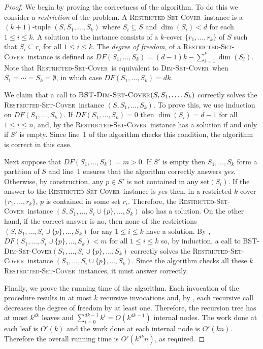 \documentclass[ccfonts,lotsofwhite]{patmorin}
\newcommand{\set}{\mathrm{set}}
\newcommand{\setcover}{\textsc{Dim-Set-Cover}}
\newcommand{\rsetcover}{\textsc{Restricted-Set-Cover}}
\newcommand{\DF}{DF}
\begin{document}
\begin{proof}
We begin by proving the correctness of the algorithm.  To do this we
consider a \emph{restriction} of the problem.  A \rsetcover\ instance
is a $(k+1)$-tuple $(S,S_1,\ldots,S_k)$ where $S_i\subseteq S$ and
$\dim(S_i)<d$ for each $1\le i\le k$.  A solution to the instance
consists of a $k$-cover $\{r_1,\ldots,r_k\}$ of $S$ such that
$S_i\subseteq r_i$ for all $1\le i\le k$.  The \emph{degree of
freedom}, of a \rsetcover\ instance is defined as
$\DF(S_1,\ldots,S_k)=(d-1)k-\sum_{i=1}^k\dim(S_i)$.  Note that
\rsetcover\ is equivalent to \setcover\ when
$S_1=\cdots=S_k=\emptyset$, in which case $\DF(S_1,\ldots,S_k)=dk$.

We claim that a call to $\textsc{BST-\setcover}(S,S_1,\ldots,S_k)$
correctly solves the \rsetcover\ instance $(S,S_1,\ldots,S_k)$.  To
prove this, we use induction on $\DF(S_1,\ldots,S_k)$.  If
$\DF(S_1,\ldots,S_k)=0$ then $\dim(S_i)=d-1$ for all $1\le i\le n$,
and, by  the \rsetcover\ instance has a
solution if and only if $S'$ is empty.  Since line~1 of the algorithm
checks this condition, the algorithm is correct in this case.

Next suppose that $\DF(S_1,\ldots,S_k)=m>0$.  If $S'$ is empty then
$S_1,\ldots,S_k$ form a partition of $S$ and line~1 ensures that the
algorithm correctly answers \emph{yes}.  Otherwise, by construction,
any $p\in S'$ is not contained in any $\set(S_i)$.  If the answer to
the \rsetcover\ instance is yes then, in a restricted $k$-cover
$\{r_1,\ldots,r_k\}$, $p$ is contained in some set $r_i$.  Therefore, the
\rsetcover\ instance
$(S,S_1,\ldots,S_i\cup\{p\},\ldots,S_k)$ also has a solution.  On the
other hand, if the correct answer is no, then none of the restrictions
$(S,S_1,\ldots,S_i\cup\{p\},\ldots,S_k)$ for any $1\le i\le k$ have a
solution.  By ,
$\DF(S_1,\ldots,S_i\cup\{p\},\ldots,S_k)<m$ for all $1\le i\le k$ so,
by induction, a call to
\textsc{BST-\setcover}$(S_1,\ldots,S_i\cup\{p\},\ldots,S_k)$ correctly
solves the \rsetcover\ instance
$(S_1,\ldots,S_i\cup\{p\},\ldots,S_k)$.  Since the algorithm checks
all these $k$ \rsetcover\ instances, it must answer correctly.

Finally, we prove the running time of the algorithm. Each invocation
of the procedure results in at most $k$ recursive invocations and, by
, each recursive call decreases the degree
of freedom by at least one.  Therefore, the recursion tree has at most
$k^{dk}$ leaves and $\sum_{i=0}^{dk-1}k^i=O(k^{dk-1})$ internal nodes.
The work done at each leaf is $O'(k)$ and the work done at each
internal node is $O'(kn)$.  Therefore the overall running time is
$O'(k^{dk}n)$, as required.
\end{proof}
\end{document}
